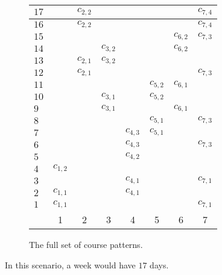 \begin{figure}
\begin{center}
\begin{tabular}{l|c|c|c|c|c|c|c}
  \hline
  $17$ & & \cellcolor{Tan}$c_{2, 2}$  & & & & &  \cellcolor{light-gray}$c_{7, 4}$ \\
  \hline
  $16$ & & \cellcolor{light-gray}$c_{2, 2}$  & & & & & \cellcolor{Tan}$c_{7, 4}$  \\
  \hline
  $15$ & &   &   & & & \cellcolor{BurntOrange}$c_{6, 2}$  & \cellcolor{light-gray}$c_{7, 3}$  \\
  \hline
  $14$ & &   & \cellcolor{BurntOrange}$c_{3, 2}$  & & & \cellcolor{light-gray}$c_{6, 2}$  &   \\
  \hline
  $13$ & & \cellcolor{BurntOrange}$c_{2, 1}$  & \cellcolor{light-gray}$c_{3, 2}$  & & &   &   \\
  \hline
  $12$ & & \cellcolor{light-gray}$c_{2, 1}$  &   & & &   & \cellcolor{BurntOrange}$c_{7, 3}$  \\
  \hline
  $11$ & & &  & & \cellcolor{ForestGreen}$c_{5, 2}$  & \cellcolor{light-gray}$c_{6, 1}$ &\\
  \hline
  $10$ & & & \cellcolor{ForestGreen}$c_{3, 1}$  & & \cellcolor{light-gray}$c_{5, 2}$  &  &\\
  \hline
  $9$ & & & \cellcolor{light-gray}$c_{3, 1} $ & &   & \cellcolor{ForestGreen}$c_{6, 1}$ &\\
  \hline
  $8$ & & & & & \cellcolor{Fuchsia}$c_{5, 1}$ & & \cellcolor{light-gray}$c_{7, 3}$\\
  \hline
  $7$ & & & & \cellcolor{Fuchsia}$c_{4, 3}$ & \cellcolor{light-gray}$c_{5, 1}$ & & \\
  \hline
  $6$ & & & & \cellcolor{light-gray}$c_{4, 3}$ & & & \cellcolor{Fuchsia}$c_{7, 3}$\\
  \hline
  $5$ & \cellcolor{NavyBlue}{\color{white} $c_{1, 2}$} & & & \cellcolor{light-gray}$c_{4, 2}$ & & & \\
  \hline
  $4$ & \cellcolor{light-gray}$c_{1, 2}$ & & & \cellcolor{NavyBlue}{\color{white}$c_{4, 2}$} & & & \\
  \hline
  $3$ & & & & \cellcolor{BrickRed}$c_{4, 1}$ & & & \cellcolor{light-gray}$c_{7, 1}$\\
  \hline
  $2$ & \cellcolor{BrickRed}$c_{1, 1}$ & & & \cellcolor{light-gray}$c_{4, 1}$ & & &  \\
  \hline
  $1$ & \cellcolor{light-gray}$c_{1, 1}$ & & & & & &  \cellcolor{BrickRed}$c_{7, 1}$\\
  \hline
  & 1 & 2 & 3 & 4 & 5 & 6 & 7
\end{tabular}
\end{center}
\caption{The full set of course patterns.}
\label{tab:sched4}
\end{figure}
In this scenario, a week would have $17$ days.

